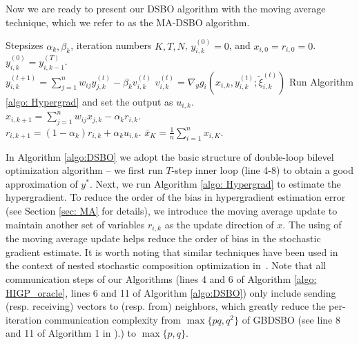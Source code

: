 \documentclass{article}
\theoremstyle{plain}
\theoremstyle{definition}
\theoremstyle{remark}
\begin{document}
Now we are ready to present our DSBO algorithm with the moving average technique, which we refer to as the MA-DSBO algorithm. 
\begin{algorithm}[ht]
    \begin{algorithmic}[1]
        \caption{MA-DSBO Algorithm}\label{algo:DSBO}
    	 Stepsizes $\alpha_k, \beta_k$, iteration numbers $K, T, N$, $y_{i,k}^{(0)} = 0$, and $x_{i,0} = r_{i,0} = 0$. %
    	    \STATE $y_{i,k}^{(0)} = y_{i,k-1}^{(T)}$. \\
        		    \STATE $y_{i,k}^{(t+1)} = \sum_{j=1}^{n}w_{ij}y_{j,k}^{(t)} -\beta_k v_{i,k}^{(t)}$  $v_{i,k}^{(t)} = \nabla_yg_i(x_{i,k}, y_{i,k}^{(t)}; \tilde{\xi}_{i,k}^{(t)})$
    		    \ENDFOR
            \ENDFOR
            \STATE Run Algorithm \ref{algo: Hypergrad} and set the output as $u_{i,k}$. \\
                \STATE $x_{i,k+1} = \sum_{j=1}^{n}w_{ij}x_{j,k} - \alpha_k r_{i,k}$. \\
        		\STATE $r_{i,k+1} = (1-\alpha_k)r_{i,k} + \alpha_ku_{i,k}$.
            \ENDFOR
        \ENDFOR
	 $\bar{x}_K = \frac{1}{n}\sum_{i=1}^{n}x_{i,K}.$
    \end{algorithmic}
\end{algorithm}
In Algorithm \ref{algo:DSBO} we adopt the basic structure of double-loop bilevel optimization algorithm \citep{ghadimi2018approximation, ji2021bilevel, chen2021closing} -- we first run $T$-step inner loop (line 4-8) to obtain a good approximation of $y^*$. Next, we run Algorithm \ref{algo: Hypergrad} to estimate the hypergradient. To reduce the order of the bias in hypergradient estimation error (see Section \ref{sec: MA} for details), we introduce the moving average update to maintain another set of variables $r_{i,k}$ as the update direction of $x$. The using of the moving average update helps reduce the order of bias in the stochastic gradient estimate. It is worth noting that similar techniques have been used in the context of nested stochastic composition optimization in~\citet{ghadimi2020single, balasubramanian2022stochastic}. 
Note that all communication steps of our Algorithms (lines 4 and 6 of Algorithm \ref{algo: HIGP_oracle}, lines 6 and 11 of Algorithm \ref{algo:DSBO}) only include sending (resp. receiving) vectors to (resp. from) neighbors, which greatly reduce the per-iteration communication complexity from $\max\{pq, q^2\}$ of GBDSBO (see line 8 and 11 of Algorithm 1 in \citet{yang2022decentralized}).) to $\max\{p, q\}$.
\end{document}
